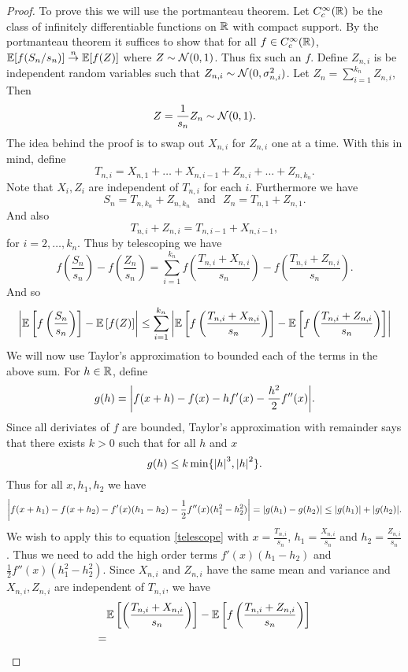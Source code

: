 \begin{proof}
To prove this we will use the portmanteau theorem. Let $C^\infty_c({\mathbb R})$ be the class of infinitely differentiable functions on ${\mathbb R}$ with compact support. By the portmanteau theorem it suffices to show that for all $f \in C^\infty_c({\mathbb R})$, ${\mathbb{E}}[f(S_n/s_n)] \stackrel{n}{\to} {\mathbb{E}}[f(Z)]$ where $Z \sim {{\mathcal{N}}}(0,1)$. Thus fix such an $f$. Define $Z_{n,i}$ is be independent random variables such that $Z_{n,i} \sim {{\mathcal{N}}}(0,\sigma_{n,i}^2)$. Let $Z_n = \sum_{i=1}^{k_n}Z_{n,i}$, Then
\[Z=\frac{1}{s_n}Z_n \sim {{\mathcal{N}}}(0,1). \]
The idea behind the proof is to swap out $X_{n,i}$ for $Z_{n,i}$ one at a time. With this in mind, define
\[T_{n,i}= X_{n,1}+\ldots+X_{n,i-1}+Z_{n,i}+\ldots+Z_{n,k_n}. \]
Note that $X_i,Z_i$ are independent of $T_{n,i}$ for each $i$. Furthermore we have
\[S_n = T_{n,k_n}+Z_{n,k_n}~~~\text{and}~~~Z_n = T_{n,1}+Z_{n,1}. \]
And also
\[T_{n,i}+Z_{n,i} = T_{n,i-1}+X_{n,i-1}, \]
for $i=2,\ldots, k_n$. Thus by telescoping we have
\[f\left(\frac{S_n}{s_n}\right)-f\left(\frac{Z_n}{s_n}\right)=\sum_{i=1}^{k_n} f\left(\frac{T_{n,i}+X_{n,i}}{s_n}\right)-f\left(\frac{T_{n,i}+Z_{n,i}}{s_n}\right). \]
And so 
\begin{equation}\label{telescope}
    {\left\lvert{\mathbb{E}}\left[f\left(\frac{S_n}{s_n}\right)\right]-{\mathbb{E}}\left[f(Z)\right]\right\rvert}\le \sum_{i=1}^{k_n}{\left\lvert{\mathbb{E}}\left[f\left(\frac{T_{n,i}+X_{n,i}}{s_n}\right)\right]-{\mathbb{E}}\left[f\left(\frac{T_{n,i}+Z_{n,i}}{s_n}\right)\right]\right\rvert}
\end{equation}
We will now use Taylor's approximation to bounded each of the terms in the above sum. For $h \in {\mathbb R}$, define
\[g(h) = {\left\lvert f(x+h)-f(x)-hf'(x)-\frac{h^2}{2}f''(x)\right\rvert}.\]
Since all deriviates of $f$ are bounded, Taylor's approximation with remainder says that there exists $k > 0$ such that for all $h$ and $x$
\[g(h) \le k \min\{{\left\lvert h\right\rvert}^3,{\left\lvert h\right\rvert}^2\}. \]
Thus for all $x,h_1,h_2$ we have
\[{\left\lvert f(x+h_1)-f(x+h_2)-f'(x)(h_1-h_2)-\frac{1}{2}f''(x)(h_1^2-h_2^2)\right\rvert}={\left\lvert g(h_1)-g(h_2)\right\rvert} \le {\left\lvert g(h_1)\right\rvert}+{\left\lvert g(h_2)\right\rvert}. \] 
We wish to apply this to equation \eqref{telescope} with $x=\frac{T_{n,i}}{s_n}$, $h_1=\frac{X_{n,i}}{s_n}$ and $h_2 = \frac{Z_{n,i}}{s_n}$. Thus we need to add the high order terms $f'(x)(h_1-h_2)$ and $\frac{1}{2}f''(x)(h_1^2-h_2^2)$. Since $X_{n,i}$ and  $Z_{n,i}$ have the same mean and variance and $X_{n,i},Z_{n,i}$ are independent of $T_{n,i}$, we have
\begin{align*}
    & {\mathbb{E}}\left[\left(\frac{T_{n,i}+X_{n,i}}{s_n}\right)\right]-{\mathbb{E}}\left[f\left(\frac{T_{n,i}+Z_{n,i}}{s_n}\right)\right]\\
    =&
\end{align*}
\end{proof}
